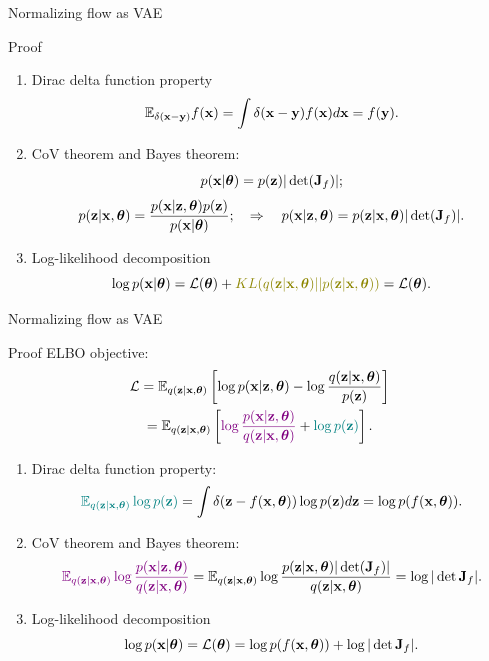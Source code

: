 \begin{frame}{Normalizing flow as VAE}
	\begin{block}{Proof}
		\begin{enumerate}
			\item Dirac delta function property 
			\[
				\mathbb{E}_{\delta(\mathbf{x} - \mathbf{y})} f(\mathbf{x}) = \int \delta(\mathbf{x} - \mathbf{y}) f(\mathbf{x}) d \mathbf{x} = f(\mathbf{y}).
			\]
			\item CoV theorem and Bayes theorem:
			\[
				p(\mathbf{x} | \boldsymbol{\theta}) = p(\mathbf{z}) |\det (\mathbf{J}_f)|;
			\]
			\[
				p(\mathbf{z} | \mathbf{x}, \boldsymbol{\theta}) = \frac{p(\mathbf{x} | \mathbf{z}, \boldsymbol{\theta}) p(\mathbf{z})}{p(\mathbf{x} | \boldsymbol{\theta})}; \quad \Rightarrow \quad p(\mathbf{x} | \mathbf{z}, \boldsymbol{\theta}) = p(\mathbf{z} | \mathbf{x}, \boldsymbol{\theta}) |\det (\mathbf{J}_f)|.
			\]
			\item Log-likelihood decomposition
			\[
				\log p(\bx | \btheta) = \cL(\btheta) + {\color{olive}KL(q(\bz | \bx, \btheta) || p(\bz | \bx, \btheta))} = \cL(\btheta).
			\]
		\end{enumerate}
	\end{block}
\end{frame}
\begin{frame}{Normalizing flow as VAE}
	\begin{block}{Proof}
		ELBO objective:
		\vspace{-0.5cm}
		\begin{multline*}
			\mathcal{L}  = \mathbb{E}_{q(\mathbf{z} | \mathbf{x}, \boldsymbol{\theta})} \left[\log p(\mathbf{x} | \mathbf{z}, \boldsymbol{\theta}) - \log \frac{q(\mathbf{z} | \mathbf{x}, \boldsymbol{\theta})}{p(\mathbf{z})} \right]  \\
			= \mathbb{E}_{q(\mathbf{z} | \mathbf{x}, \boldsymbol{\theta})} \left[{\color{violet}\log \frac{p(\mathbf{x} | \mathbf{z}, \boldsymbol{\theta})}{q(\mathbf{z} | \mathbf{x}, \boldsymbol{\theta})}} + {\color{teal}\log p(\mathbf{z})} \right].
		\end{multline*}
		\vspace{-0.6cm}
		\begin{enumerate}
			\item  Dirac delta function property:
			\vspace{-0.3cm}
			\[
				{\color{teal}\mathbb{E}_{q(\mathbf{z} | \mathbf{x}, \boldsymbol{\theta})} \log p(\mathbf{z})} = \int \delta (\mathbf{z} - f(\mathbf{x}, \boldsymbol{\theta})) \log p(\mathbf{z}) d \mathbf{z} = \log p(f(\mathbf{x}, \boldsymbol{\theta})).
			\]
			\vspace{-0.6cm}
			\item CoV theorem and Bayes theorem:
			\vspace{-0.2cm}
			{ \small
			\[ 
				{\color{violet}\mathbb{E}_{q(\mathbf{z} | \mathbf{x}, \boldsymbol{\theta})} \log \frac{p(\mathbf{x} | \mathbf{z}, \boldsymbol{\theta})}{q(\mathbf{z} | \mathbf{x}, \boldsymbol{\theta})}} = \mathbb{E}_{q(\mathbf{z} | \mathbf{x}, \boldsymbol{\theta})} \log \frac{p(\mathbf{z} | \mathbf{x}, \boldsymbol{\theta}) |\det (\mathbf{J}_f)|}{q(\mathbf{z} | \mathbf{x}, \boldsymbol{\theta})} = \log |\det \mathbf{J}_f|.
			\]
			}
			\vspace{-0.6cm}
			\item Log-likelihood decomposition
			\vspace{-0.3cm}
			\[
				\log p(\mathbf{x} | \boldsymbol{\theta}) = \mathcal{L}(\boldsymbol{\theta}) = \log p(f(\mathbf{x}, \boldsymbol{\theta})) +  \log |\det \mathbf{J}_f|.
			\]
		\end{enumerate}
	\end{block}
\end{frame}
